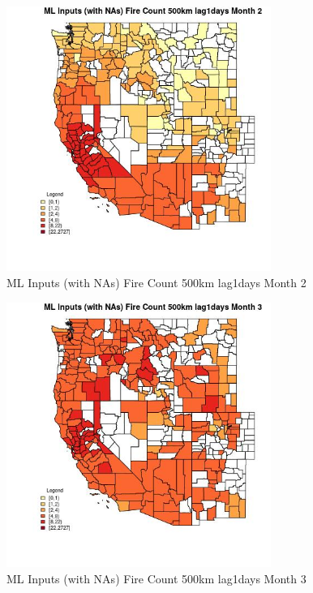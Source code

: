 \begin{figure} 
\centering  
\includegraphics[width=0.77\textwidth]{Code_Outputs/Report_ML_input_PM25_Step4_part_f_de_duplicated_aves_prioritize_24hr_obswNAs_CountyFire_Count_500km_lag1daysmedianMonth2.jpg} 
\caption{\label{fig:Report_ML_input_PM25_Step4_part_f_de_duplicated_aves_prioritize_24hr_obswNAsCountyFire_Count_500km_lag1daysmedianMonth2}ML Inputs (with NAs) Fire Count 500km lag1days Month 2} 
\end{figure} 
 

\begin{figure} 
\centering  
\includegraphics[width=0.77\textwidth]{Code_Outputs/Report_ML_input_PM25_Step4_part_f_de_duplicated_aves_prioritize_24hr_obswNAs_CountyFire_Count_500km_lag1daysmedianMonth3.jpg} 
\caption{\label{fig:Report_ML_input_PM25_Step4_part_f_de_duplicated_aves_prioritize_24hr_obswNAsCountyFire_Count_500km_lag1daysmedianMonth3}ML Inputs (with NAs) Fire Count 500km lag1days Month 3} 
\end{figure} 
 

